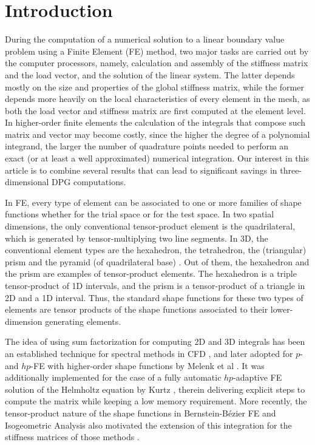 \section{Introduction}

During the computation of a numerical solution to a linear boundary value problem using a Finite Element (FE) method, two major tasks are carried out by the computer processors, namely, calculation and assembly of the stiffness matrix and the load vector, and the solution of the linear system. The latter depends mostly on the size and properties of the global stiffness matrix, while the former depends more heavily on the local characteristics of every element in the mesh, as both the load vector and stiffness matrix are first computed at the element level. In higher-order finite elements the calculation of the integrals that compose such matrix and vector may become costly, since the higher the degree of a polynomial integrand, the larger the number of quadrature points needed to perform an exact (or at least a well approximated) numerical integration. Our interest in this article is to combine several results that can lead to significant savings in three-dimensional DPG computations.

In FE, every type of element can be associated to one or more families of shape functions whether for the trial space or for the test space. In two spatial dimensions, the only conventional tensor-product element is the quadrilateral, which is generated by tensor-multiplying two line segments. In 3D, the conventional element types are the hexahedron, the tetrahedron, the (triangular) prism and the pyramid (of quadrilateral base) \cite{Fuentes2015}. Out of them, the hexahedron and the prism are examples of tensor-product elements. The hexahedron is a triple tensor-product of 1D intervals, and the prism is a tensor-product of a triangle in 2D and a 1D interval. Thus, the standard shape functions for these two types of elements are tensor products of the shape functions associated to their lower-dimension generating elements.

The idea of using sum factorization for computing 2D and 3D integrals has been an established technique for spectral methods in CFD \cite{orszag1980spectral,karniadakis2013spectral}, and later adopted for $p$- and $hp$-FE with higher-order shape functions by Melenk et al \cite{melenk2001fully}. It was additionally implemented for the case of a fully automatic $hp$-adaptive FE solution of the Helmholtz equation by Kurtz \cite{kurtz2007fully}, therein delivering explicit steps to compute the matrix while keeping a low memory requirement. More recently, the tensor-product nature of the shape functions in Bernstein-B\'ezier FE and Isogeometric Analysis also motivated the extension of this integration for the stiffness matrices of those methods \cite{AinsworthBezier,antolin2015efficient}.

